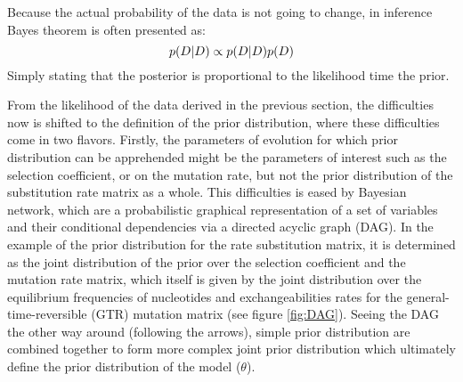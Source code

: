 Because the actual probability of the data is not going to change, in inference Bayes theorem is often presented as:
\begin{equation}
p(D|D) \propto p(D|D)p(D)
\end{equation}
Simply stating that the \gls{posterior} is proportional to the \gls{likelihood} time the \gls{prior}.

From the \gls{likelihood} of the data derived in the previous section, the difficulties now is shifted to the definition of the \gls{prior} distribution, where these difficulties come in two flavors.
Firstly, the parameters of evolution for which \gls{prior} distribution can be apprehended might be the parameters of interest such as the selection coefficient, or on the mutation rate, but not the \gls{prior} distribution of the \gls{substitution} rate matrix as a whole.
This difficulties is eased by Bayesian network, which are a probabilistic graphical representation of a set of variables and their conditional dependencies via a directed acyclic graph (DAG).
In the example of the \gls{prior} distribution for the rate \gls{substitution} matrix, it is determined as the joint distribution of the \gls{prior} over the selection coefficient and the mutation rate matrix, which itself is given by the joint distribution over the equilibrium frequencies of nucleotides and exchangeabilities rates for the general-time-reversible (GTR) mutation matrix (see figure \ref{fig:DAG}).
Seeing the DAG the other way around (following the arrows), simple \gls{prior} distribution are combined together to form more complex joint \gls{prior} distribution which ultimately define the \gls{prior} distribution of the model ($\theta$).

